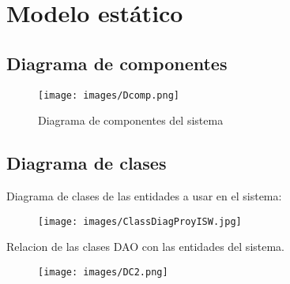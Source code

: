 \chapter{Modelo estático}
\label{cap:ModeloEstatico}
\section{Diagrama de componentes}
\begin{figure}[htbp!]
    \centering
    \texttt{[image: images/Dcomp.png]}
    \caption{Diagrama de componentes del sistema}
    \label{fig:my_label}
\end{figure}
\clearpage

\section{Diagrama de clases}
Diagrama de clases de las entidades a usar en el sistema:
\begin{figure}[htbp!]
    \centering
    \texttt{[image: images/ClassDiagProyISW.jpg]}
    \label{fig:my_label}
\end{figure}
\clearpage
Relacion de las clases DAO con las entidades del sistema.  
\begin{figure}[htbp!]
    \centering
    \texttt{[image: images/DC2.png]}
    \label{fig:my_label}
\end{figure}
\clearpage

